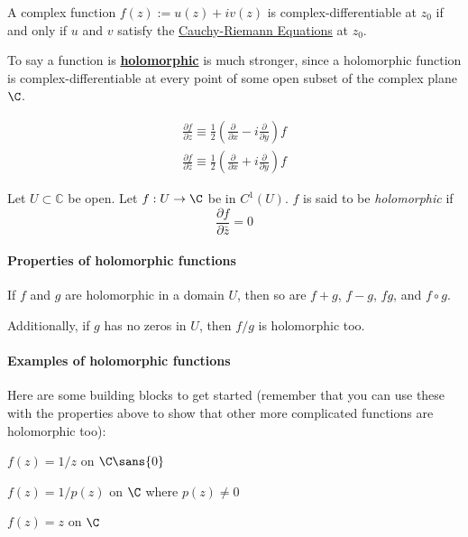 \label{d1d5d93}

A complex function $f(z):=u(z)+iv(z)$ is complex-differentiable at $z_0$ if and
only if $u$ and $v$ satisfy the \href{fb10fd3}{Cauchy-Riemann Equations} at
$z_0$.

To say a function is \href{e1e08f7}{\textbf{holomorphic}} is much stronger,
since a holomorphic function is complex-differentiable at every point of some
open subset of the complex plane $\C$.

\label{ffea0ed}

\begin{gather*}
  \frac{\partial f}{\partial z}\equiv\frac12\left(\frac{\partial}{\partial x}-i\frac{\partial}{\partial y}\right)f \\[1em]
  \frac{\partial f}{\partial\bar z}\equiv\frac12\left(\frac{\partial}{\partial x}+i\frac{\partial}{\partial y}\right)f
\end{gather*}

\label{e1e08f7}

Let $U\subset\mathbb C$ be open. Let $f:U\to\C$ be in $C^1(U)$. $f$ is said to
be \textit{holomorphic} if
$$
  \frac{\partial f}{\partial\bar z}=0
$$

\paragraph{Properties of holomorphic functions} If $f$ and $g$ are holomorphic in a domain $U$, then so are $f+g$, $f-g$, $fg$,
and $f\circ g$.

Additionally, if $g$ has no zeros in $U$, then $f/g$ is holomorphic too.

\paragraph{Examples of holomorphic functions}

Here are some building blocks to get started (remember that you can use these
with the properties above to show that other more complicated functions are
holomorphic too):
\begin{enumerati}
  \item $f(z)=1/z$ on $\C\sans{0}$
  \item $f(z)=1/p(z)$ on $\C$ where $p(z)\neq0$
  \item $f(z)=z$ on $\C$
\end{enumerati}

